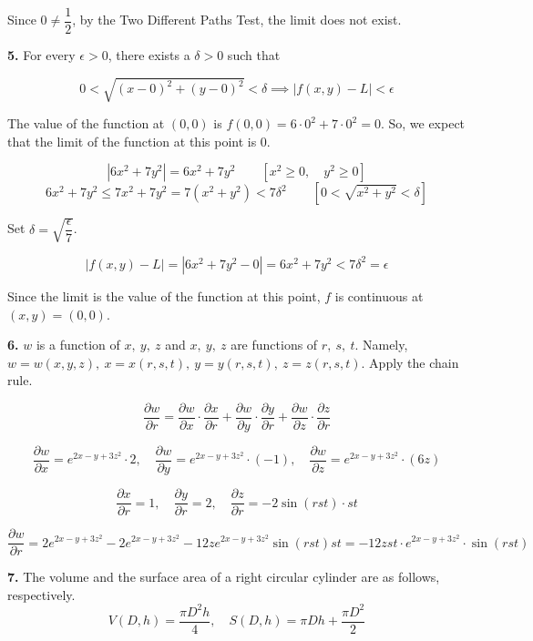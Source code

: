 \documentclass{article}
\begin{document}
Since $0\neq\dfrac12$, by the Two Different Paths Test, the limit does not exist.

\vspace{1em}

\textbf{5.} For every $\epsilon>0$, there exists a $\delta>0$ such that

\[0<\sqrt{(x-0)^2+(y-0)^2}<\delta\implies\left|f(x,y)-L\right|<\epsilon\]

The value of the function at $(0,0)$ is $f(0,0)=6\cdot0^2+7\cdot0^2=0$. So, we expect that the limit of the function at this point is $0$.

\[\left|6x^2+7y^2\right|=6x^2+7y^2\qquad\left[x^2\geq0,\quad y^2\geq0\right]\]
\[6x^2+7y^2\leq7x^2+7y^2=7\left(x^2+y^2\right)<7\delta^2\qquad\left[0<\sqrt{x^2+y^2}<\delta\right]\]

Set $\delta=\sqrt{\dfrac\epsilon7}$.

\[\left|f(x,y)-L\right|=|6x^2+7y^2-0|=6x^2+7y^2<7\delta^2=\epsilon\]

Since the limit is the value of the function at this point, $f$ is continuous at $(x,y)=(0,0)$.

\vspace{1em}

\textbf{6.} $w$ is a function of $x,\:y,\:z$ and $x,\:y,\:z$ are functions of $r,\:s,\:t$. Namely, $w=w(x,y,z),\:x=x(r,s,t),\:y=y(r,s,t),\:z=z(r,s,t)$. Apply the chain rule.

\[\frac{\partial w}{\partial r}=\frac{\partial w}{\partial x}\cdot\frac{\partial x}{\partial r}+\frac{\partial w}{\partial y}\cdot\frac{\partial y}{\partial r}+\frac{\partial w}{\partial z}\cdot\frac{\partial z}{\partial r}\]

\[\frac{\partial w}{\partial x}={e}^{2x-y+3z^2}\cdot2,\quad\frac{\partial w}{\partial y}={e}^{2x-y+3z^2}\cdot(-1),\quad\frac{\partial w}{\partial z}={e}^{2x-y+3z^2}\cdot(6z)\]

\[\frac{\partial x}{\partial r}=1,\quad\frac{\partial y}{\partial r}=2,\quad\frac{\partial z}{\partial r}=-2\sin(rst)\cdot st\]

\[\frac{\partial w}{\partial r}=2{e}^{2x-y+3z^2}-2{e}^{2x-y+3z^2}-12z{e}^{2x-y+3z^2}\sin(rst)st=\boxed{-12zst\cdot{e}^{2x-y+3z^2}\cdot\sin(rst)}\]

\vspace{1em}

\textbf{7.} The volume and the surface area of a right circular cylinder are as follows, respectively.
\[V(D,h)=\frac{\pi D^2h}4,\quad S(D,h)=\pi Dh+\frac{\pi D^2}2\]
\end{document}
